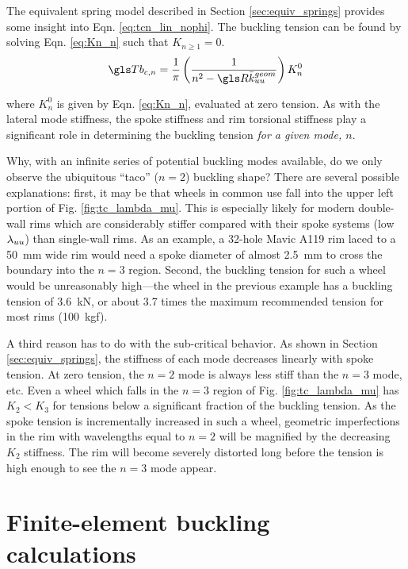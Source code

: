 \documentclass[\rootdir/thesis.tex]{subfiles}
\begin{document}
The equivalent spring model described in Section \ref{sec:equiv_springs} provides some insight into Eqn. \eqref{eq:tcn_lin_nophi}. The buckling tension can be found by solving Eqn. \eqref{eq:Kn_n} such that $K_{n\geq 1} = 0$.
\begin{equation}
\label{eq:Tcn_equiv_springs}
\Tb_{c,n} = \frac{1}{\pi}\left(\frac{1}{n^2 - \R\geom{\kuu}}\right) K_n^0
\end{equation}

where $K_n^0$ is given by Eqn. \eqref{eq:Kn_n}, evaluated at zero tension. As with the lateral mode stiffness, the spoke stiffness and rim torsional stiffness play a significant role in determining the buckling tension \emph{for a given mode, $n$}.

Why, with an infinite series of potential buckling modes available, do we only observe the ubiquitous ``taco'' ($n=2$) buckling shape? There are several possible explanations: first, it may be that wheels in common use fall into the upper left portion of Fig. \ref{fig:tc_lambda_mu}. This is especially likely for modern double-wall rims which are considerably stiffer compared with their spoke systems (low $\lambda_{uu}$) than single-wall rims. As an example, a 32-hole Mavic A119 rim laced to a \SI{50}{mm} wide rim would need a spoke diameter of almost \SI{2.5}{mm} to cross the boundary into the $n=3$ region. Second, the buckling tension for such a wheel would be unreasonably high---the wheel in the previous example has a buckling tension of \SI{3.6}{kN}, or about 3.7 times the maximum recommended tension for most rims (\SI{100}{kgf}).

A third reason has to do with the sub-critical behavior. As shown in Section \ref{sec:equiv_springs}, the stiffness of each mode decreases linearly with spoke tension. At zero tension, the $n=2$ mode is always less stiff than the $n=3$ mode, etc. Even a wheel which falls in the $n=3$ region of Fig. \ref{fig:tc_lambda_mu} has $K_2<K_3$ for tensions below a significant fraction of the buckling tension. As the spoke tension is incrementally increased in such a wheel, geometric imperfections in the rim with wavelengths equal to $n=2$ will be magnified by the decreasing $K_2$ stiffness. The rim will become severely distorted long before the tension is high enough to see the $n=3$ mode appear.


\section{Finite-element buckling calculations}
\end{document}
